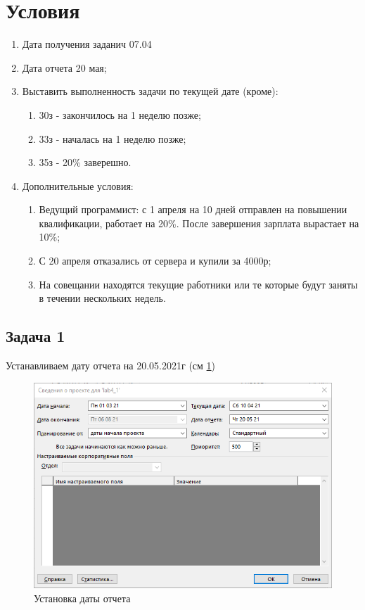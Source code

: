 \section{Условия}
\begin{enumerate}
	\item Дата получения заданич 07.04
	\item Дата отчета 20 мая;
	\item Выставить выполненность задачи по текущей дате (кроме):
	\begin{enumerate}
		\item 30з - закончилось на 1 неделю позже;
		\item 33з - началась на 1 неделю позже;
		\item 35з - 20\% заверешно.
	\end{enumerate}
	\item Дополнительные условия:
	\begin{enumerate}
		\item Ведущий программист: с 1 апреля на 10 дней отправлен на повышении квалификации, работает на 20\%. После завершения зарплата вырастает на 10\%;
		\item С 20 апреля отказались от сервера и купили за 4000р;
		\item На совещании находятся текущие работники или те которые будут заняты в течении нескольких недель.
	\end{enumerate}
\end{enumerate}

\subsection{Задача 1}
Устанавливаем дату отчета на 20.05.2021г (см \ref{fig:411})
\begin{figure}[H]
	\centering
	\includegraphics[width=0.7\linewidth]{src/4_1_1}
	\caption{Установка даты отчета}
	\label{fig:411}
\end{figure}


